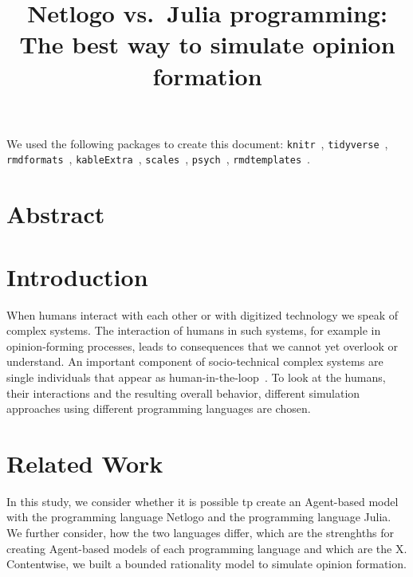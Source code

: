 \documentclass[runningheads]{llncs}
\begin{document}
%
\title{Netlogo vs.~Julia programming: The best way to simulate opinion
formation}
%
%


%
\maketitle              %
%
\begin{abstract}

\end{abstract}
%
%
%
We used the following packages to create this document:
\texttt{knitr}~\autocite{R-knitr},
\texttt{tidyverse}~\autocite{R-tidyverse},
\texttt{rmdformats}~\autocite{R-rmdformats},
\texttt{kableExtra}~\autocite{R-kableExtra},
\texttt{scales}~\autocite{R-scales}, \texttt{psych}~\autocite{R-psych},
\texttt{rmdtemplates}~\autocite{R-rmdtemplates}.

\hypertarget{abstract}{%
\section{Abstract}\label{abstract}}

\hypertarget{introduction}{%
\section{Introduction}\label{introduction}}

When humans interact with each other or with digitized technology we
speak of complex systems. The interaction of humans in such systems, for
example in opinion-forming processes, leads to consequences that we
cannot yet overlook or understand. An important component of
socio-technical complex systems are single individuals that appear as
human-in-the-loop~\autocite{Valdez2018human}. To look at the humans,
their interactions and the resulting overall behavior, different
simulation approaches using different programming languages are chosen.

\hypertarget{related-work}{%
\section{Related Work}\label{related-work}}

In this study, we consider whether it is possible tp create an
Agent-based model with the programming language Netlogo and the
programming language Julia. We further consider, how the two languages
differ, which are the strenghths for creating Agent-based models of each
programming language and which are the X. Contentwise, we built a
bounded rationality model to simulate opinion formation.
\end{document}
